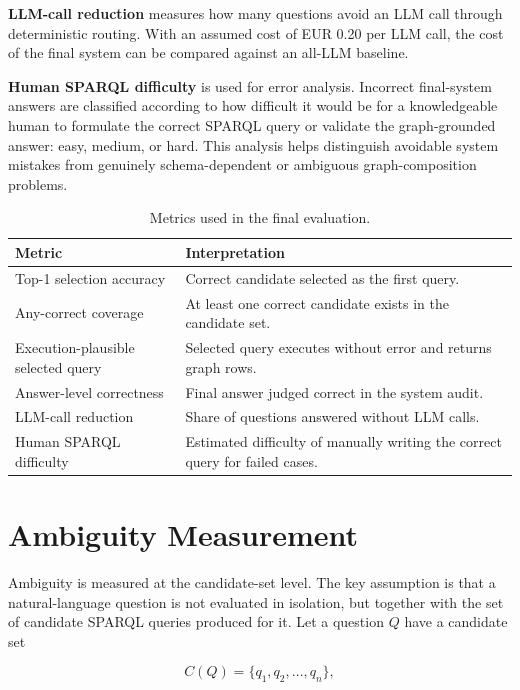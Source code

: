 \documentclass[
  12pt,
  english,
  oneside]{report}
\begin{document}
\textbf{LLM-call reduction} measures how many questions avoid an LLM call through deterministic routing. With an assumed cost of EUR 0.20 per LLM call, the cost of the final system can be compared against an all-LLM baseline.

\textbf{Human SPARQL difficulty} is used for error analysis. Incorrect final-system answers are classified according to how difficult it would be for a knowledgeable human to formulate the correct SPARQL query or validate the graph-grounded answer: easy, medium, or hard. This analysis helps distinguish avoidable system mistakes from genuinely schema-dependent or ambiguous graph-composition problems.

\begin{table}[htbp]
\centering
\caption{Metrics used in the final evaluation.}
\label{tab:evaluation-metrics}
\small
\begin{tabularx}{\textwidth}{
>{\raggedright\arraybackslash}p{3.6cm}
>{\raggedright\arraybackslash}X
}
\toprule
\textbf{Metric} & \textbf{Interpretation} \\
\midrule
Top-1 selection accuracy & Correct candidate selected as the first query. \\
Any-correct coverage & At least one correct candidate exists in the candidate set. \\
Execution-plausible selected query & Selected query executes without error and returns graph rows. \\
Answer-level correctness & Final answer judged correct in the system audit. \\
LLM-call reduction & Share of questions answered without LLM calls. \\
Human SPARQL difficulty & Estimated difficulty of manually writing the correct query for failed cases. \\
\bottomrule
\end{tabularx}
\end{table}

\section{Ambiguity Measurement}
\label{sec:ambiguity-measurement}

Ambiguity is measured at the candidate-set level. The key assumption is that a natural-language question is not evaluated in isolation, but together with the set of candidate SPARQL queries produced for it. Let a question \(Q\) have a candidate set

\[
C(Q) = \{q_1, q_2, \ldots, q_n\},
\]
\end{document}
